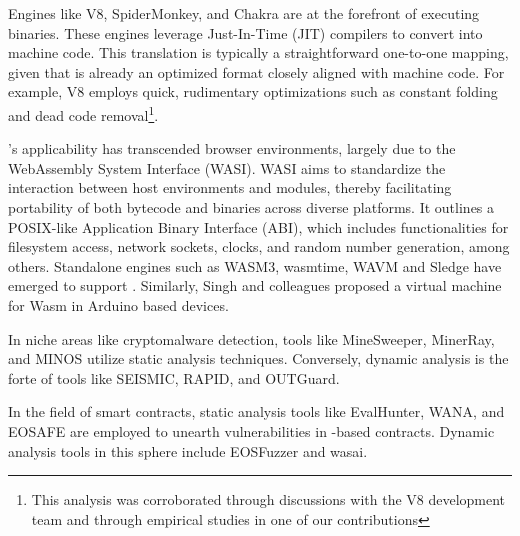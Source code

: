  Engines like V8\cite{v8}, SpiderMonkey\cite{spidermonkey}, and Chakra\cite{chakra} are at the forefront of executing \Wasm binaries. 
These engines leverage Just-In-Time (JIT) compilers to convert \Wasm into machine code. 
This translation is typically a straightforward one-to-one mapping, given that \Wasm is already an optimized format closely aligned with machine code. 
For example, V8 employs quick, rudimentary optimizations such as constant folding and dead code removal\footnote{This analysis was corroborated through discussions with the V8 development team and through empirical studies in one of our contributions\cite{CROW}}. 

 \Wasm's applicability has transcended browser environments, largely due to the WebAssembly System Interface (WASI)\cite{WASI}. 
WASI aims to standardize the interaction between host environments and \Wasm modules, thereby facilitating portability of both bytecode and binaries across diverse platforms. 
It outlines a POSIX-like Application Binary Interface (ABI), which includes functionalities for filesystem access, network sockets, clocks, and random number generation, among others. 
Standalone engines such as WASM3\cite{wasm3}, wasmtime\cite{wasmtime}, WAVM\cite{WAVM} and Sledge \cite{Sledge} have emerged to support \Wasm.
Similarly, Singh and colleagues \cite{WARDuino2019} proposed a virtual machine for Wasm in Arduino based devices.



 In niche areas like cryptomalware detection, tools like MineSweeper\cite{Minesweeper}, MinerRay\cite{MinerRay}, and MINOS\cite{MINOS} utilize static analysis techniques. 
Conversely, dynamic analysis is the forte of tools like SEISMIC\cite{SEISMIC}, RAPID\cite{RAPID}, and OUTGuard\cite{outguard}.

 In the field of smart contracts, static analysis tools like EvalHunter\cite{evalhunter}, WANA\cite{wana}, and EOSAFE\cite{eosafe} are employed to unearth vulnerabilities in \Wasm-based contracts. Dynamic analysis tools in this sphere include EOSFuzzer\cite{eosfuzzer} and wasai\cite{wasai}.


 

